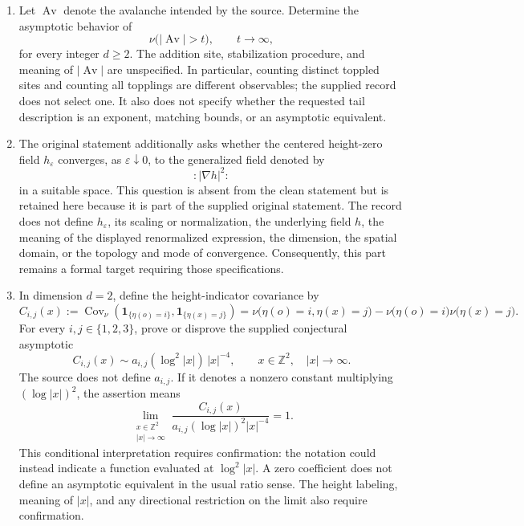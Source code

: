 \documentclass[11pt]{article}
\newcommand{\Z}{\mathbb{Z}}
\begin{document}
\begin{enumerate}
\item Let \(\operatorname{Av}\) denote the avalanche intended by the source. Determine the asymptotic behavior of
\[
\nu\bigl(|\operatorname{Av}|>t\bigr),\qquad t\to\infty,
\]
for every integer \(d\geq2\). The addition site, stabilization procedure, and meaning of \(|\operatorname{Av}|\) are unspecified. In particular, counting distinct toppled sites and counting all topplings are different observables; the supplied record does not select one. It also does not specify whether the requested tail description is an exponent, matching bounds, or an asymptotic equivalent.

\item The original statement additionally asks whether the centered height-zero field \(h_\varepsilon\) converges, as \(\varepsilon\downarrow0\), to the generalized field denoted by
\[
:\!|\nabla h|^2\!:
\]
in a suitable space. This question is absent from the clean statement but is retained here because it is part of the supplied original statement. The record does not define \(h_\varepsilon\), its scaling or normalization, the underlying field \(h\), the meaning of the displayed renormalized expression, the dimension, the spatial domain, or the topology and mode of convergence. Consequently, this part remains a formal target requiring those specifications.

\item In dimension \(d=2\), define the height-indicator covariance by
\[
C_{i,j}(x)
:=\operatorname{Cov}_{\nu}\!\left(\mathbf{1}_{\{\eta(o)=i\}},\mathbf{1}_{\{\eta(x)=j\}}\right)
=\nu\bigl(\eta(o)=i,\eta(x)=j\bigr)
-\nu\bigl(\eta(o)=i\bigr)\nu\bigl(\eta(x)=j\bigr).
\]
For every \(i,j\in\{1,2,3\}\), prove or disprove the supplied conjectural asymptotic
\[
C_{i,j}(x)\sim a_{i,j}(\log^2|x|)\,|x|^{-4},
\qquad x\in\Z^2,\quad |x|\to\infty.
\]
The source does not define \(a_{i,j}\). If it denotes a nonzero constant multiplying \((\log|x|)^2\), the assertion means
\[
\lim_{\substack{x\in\Z^2\\|x|\to\infty}}
\frac{C_{i,j}(x)}{a_{i,j}(\log|x|)^2|x|^{-4}}=1.
\]
This conditional interpretation requires confirmation: the notation could instead indicate a function evaluated at \(\log^2|x|\). A zero coefficient does not define an asymptotic equivalent in the usual ratio sense. The height labeling, meaning of \(|x|\), and any directional restriction on the limit also require confirmation.
\end{enumerate}
\end{document}
